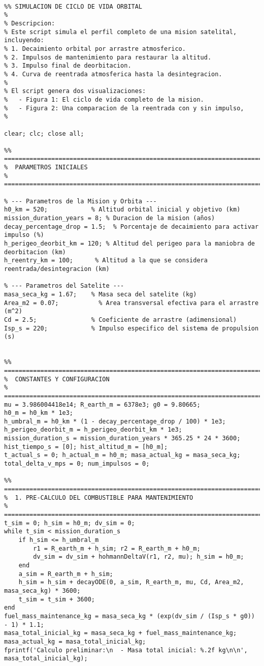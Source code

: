 \begin{verbatim}

%% SIMULACION DE CICLO DE VIDA ORBITAL
%
% Descripcion:
% Este script simula el perfil completo de una mision satelital, incluyendo:
% 1. Decaimiento orbital por arrastre atmosferico.
% 2. Impulsos de mantenimiento para restaurar la altitud.
% 3. Impulso final de deorbitacion.
% 4. Curva de reentrada atmosferica hasta la desintegracion.
%
% El script genera dos visualizaciones:
%   - Figura 1: El ciclo de vida completo de la mision.
%   - Figura 2: Una comparacion de la reentrada con y sin impulso,
%               

clear; clc; close all;

%% ========================================================================
%  PARAMETROS INICIALES
%  ========================================================================

% --- Parametros de la Mision y Orbita ---
h0_km = 520;            % Altitud orbital inicial y objetivo (km)
mission_duration_years = 8; % Duracion de la mision (años)
decay_percentage_drop = 1.5;  % Porcentaje de decaimiento para activar impulso (%)
h_perigeo_deorbit_km = 120; % Altitud del perigeo para la maniobra de deorbitacion (km)
h_reentry_km = 100;      % Altitud a la que se considera reentrada/desintegracion (km)

% --- Parametros del Satelite ---
masa_seca_kg = 1.67;    % Masa seca del satelite (kg)
Area_m2 = 0.07;           % Area transversal efectiva para el arrastre (m^2)
Cd = 2.5;               % Coeficiente de arrastre (adimensional)
Isp_s = 220;            % Impulso especifico del sistema de propulsion (s)


%% ========================================================================
%  CONSTANTES Y CONFIGURACION
%  ========================================================================
mu = 3.986004418e14; R_earth_m = 6378e3; g0 = 9.80665;
h0_m = h0_km * 1e3;
h_umbral_m = h0_km * (1 - decay_percentage_drop / 100) * 1e3;
h_perigeo_deorbit_m = h_perigeo_deorbit_km * 1e3;
mission_duration_s = mission_duration_years * 365.25 * 24 * 3600;
hist_tiempo_s = [0]; hist_altitud_m = [h0_m];
t_actual_s = 0; h_actual_m = h0_m; masa_actual_kg = masa_seca_kg;
total_delta_v_mps = 0; num_impulsos = 0;

%% ========================================================================
%  1. PRE-CALCULO DEL COMBUSTIBLE PARA MANTENIMIENTO
%  ========================================================================
t_sim = 0; h_sim = h0_m; dv_sim = 0;
while t_sim < mission_duration_s
    if h_sim <= h_umbral_m
        r1 = R_earth_m + h_sim; r2 = R_earth_m + h0_m;
        dv_sim = dv_sim + hohmannDeltaV(r1, r2, mu); h_sim = h0_m;
    end
    a_sim = R_earth_m + h_sim;
    h_sim = h_sim + decayODE(0, a_sim, R_earth_m, mu, Cd, Area_m2, masa_seca_kg) * 3600;
    t_sim = t_sim + 3600;
end
fuel_mass_maintenance_kg = masa_seca_kg * (exp(dv_sim / (Isp_s * g0)) - 1) * 1.1;
masa_total_inicial_kg = masa_seca_kg + fuel_mass_maintenance_kg;
masa_actual_kg = masa_total_inicial_kg;
fprintf('Calculo preliminar:\n  - Masa total inicial: %.2f kg\n\n', masa_total_inicial_kg);


\end{verbatim}
